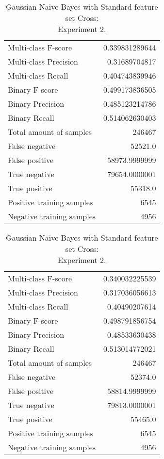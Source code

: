 \begin{table}[H]
\begin{minipage}{0.5\textwidth}
\caption{Gaussian Naive Bayes with Standard feature set Cross: \\Experiment 1.}
\centering
\begin{tabular}{l r}
\toprule
Multi-class F-score & 0.339831289644 \\
Multi-class Precision & 0.31689704817 \\
Multi-class Recall & 0.404743839946 \\
\midrule
Binary F-score & 0.499173836505 \\
Binary Precision & 0.485123214786 \\
Binary Recall & 0.514062630403 \\
\midrule
Total amount of samples & 246467 \\
False negative & 52521.0 \\
False positive & 58973.9999999 \\
True negative & 79654.0000001 \\
True positive & 55318.0 \\
\midrule
Positive training samples & 6545 \\
Negative training samples & 4956 \\
\bottomrule
\end{tabular}
\end{minipage}
\hfillx
\begin{minipage}{0.5\textwidth}
\caption{Gaussian Naive Bayes with Standard feature set Cross: \\Experiment 2.}
\centering
\begin{tabular}{l r}
\toprule
Multi-class F-score & 0.340032225539 \\
Multi-class Precision & 0.317036056613 \\
Multi-class Recall & 0.40490207614 \\
\midrule
Binary F-score & 0.498791856754 \\
Binary Precision & 0.48533630438 \\
Binary Recall & 0.513014772021 \\
\midrule
Total amount of samples & 246467 \\
False negative & 52374.0 \\
False positive & 58814.9999999 \\
True negative & 79813.0000001 \\
True positive & 55465.0 \\
\midrule
Positive training samples & 6545 \\
Negative training samples & 4956 \\
\bottomrule
\end{tabular}
\end{minipage}
\end{table}
